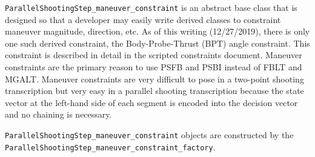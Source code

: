\texttt{ParallelShootingStep\_maneuver\_constraint} is an abstract base class that is designed so that a developer may easily write derived classes to constraint maneuver magnitude, direction, etc. As of this writing (12/27/2019), there is only one such derived constraint, the Body-Probe-Thrust (BPT) angle constraint. This constraint is described in detail in the scripted constraints document. Maneuver constraints are the primary reason to use \ac{PSFB} and \ac{PSBI} instead of \ac{FBLT} and \ac{MGALT}. Maneuver constraints are very difficult to pose in a two-point shooting transcription but very easy in a parallel shooting transcription because the state vector at the left-hand side of each segment is encoded into the decision vector and no chaining is necessary.

\texttt{ParallelShootingStep\_maneuver\_constraint} objects are constructed by the \texttt{ParallelShootingStep\_maneuver\_constraint\_factory}.

	
\endinput